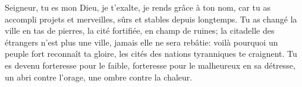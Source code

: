 Seigneur, tu es mon Dieu, je t’exalte, je rends grâce à ton nom,
	car tu as accompli projets et merveilles, sûrs et stables depuis longtemps.
Tu as changé la ville en tas de pierres, la cité fortifiée, en champ de ruines;
	la citadelle des étrangers n’est plus une ville, jamais elle ne sera rebâtie:
	voilà pourquoi un peuple fort reconnaît ta gloire,
	les cités des nations tyranniques te craignent.
Tu es devenu forteresse pour le faible, forteresse pour le malheureux en sa détresse,
	un abri contre l’orage, une ombre contre la chaleur.
